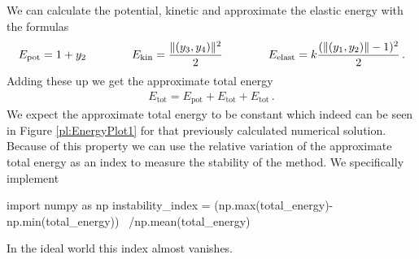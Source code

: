 \documentclass{scrartcl}
\DeclarePairedDelimiter{\norm}{\lVert}{\rVert}
\newcounter{constant}
\begin{document}
We can calculate the potential, kinetic and approximate the elastic energy with the formulas
\begin{align*}
	E_{\text{pot}}=1+y_2
	\qquad\qquad E_{\text{kin}}=\frac{\norm{(y_3,y_4)}^2}{2}
	\qquad\qquad E_{\text{elast}}=k\frac{(\norm{(y_1,y_2)}-1)^2}{2}\,.
\end{align*}
Adding these up we get the approximate total energy
\begin{align*}
	E_{\text{tot}}=E_{\text{pot}}+E_{\text{tot}}+E_{\text{tot}}\,.
\end{align*}
We expect the approximate total energy to be constant which indeed can be seen in Figure \ref{pl:EnergyPlot1} for that previously calculated numerical solution.
Because of this property we can use the relative variation of the approximate total energy as an index to measure the stability of the method. We specifically implement
\begin{python}
import numpy as np
instability_index = (np.max(total_energy)-np.min(total_energy)) \
				              /np.mean(total_energy)
\end{python}
In the ideal world this index almost vanishes.
\end{document}
